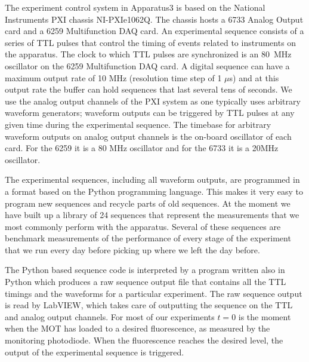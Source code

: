 \documentclass[oneside,12pt]{memoir}
\begin{document}
The experiment control system in Apparatus3 is based on the National
Instruments PXI chassis NI-PXIe1062Q.   The chassis hosts a 6733 Analog Output
card and a 6259 Multifunction DAQ card.   An experimental sequence consists of
a series of TTL pulses that control the timing of events related to instruments
on the apparatus.  The clock to which TTL pulses are synchronized is an 80~MHz
oscillator on the 6259 Multifunction DAQ card.    A digital sequence can have a
maximum output rate of 10 MHz (resolution time step of 1 $\mu$s) and at this
output rate the buffer can hold sequences that last several tens of seconds.
We use the analog output channels of the PXI system as one typically uses
arbitrary waveform generators; waveform outputs can be triggered by TTL pulses
at any given time during the experimental sequence.  The timebase for arbitrary
waveform outputs on analog output channels is the on-board oscillator of each
card.  For the 6259 it is a 80 MHz oscillator and for the 6733 it is a 20MHz
oscillator.  

The experimental sequences, including all waveform outputs,  are programmed in
a format based on the Python programming language.  This makes it very easy
to program new sequences and recycle parts of old sequences.  At the moment we
have built up a library of 24 sequences  that represent the measurements that we
most commonly perform with the apparatus.   Several of these sequences are
benchmark measurements of the performance of every stage of the experiment that
we run every day before picking up where we left the day before.   

The Python  based sequence code is interpreted by a program written also in
Python which produces a raw sequence output file that contains all the TTL
timings and the waveforms for a particular experiment.  The raw sequence output
is read by LabVIEW, which takes care of outputting the sequence on the TTL and
analog output channels.  For most of our experiments $t=0$ is the moment when
the MOT has loaded to a desired fluorescence, as measured by the monitoring
photodiode.   When the fluorescence reaches the desired level, the output of
the experimental sequence is triggered.
\end{document}

